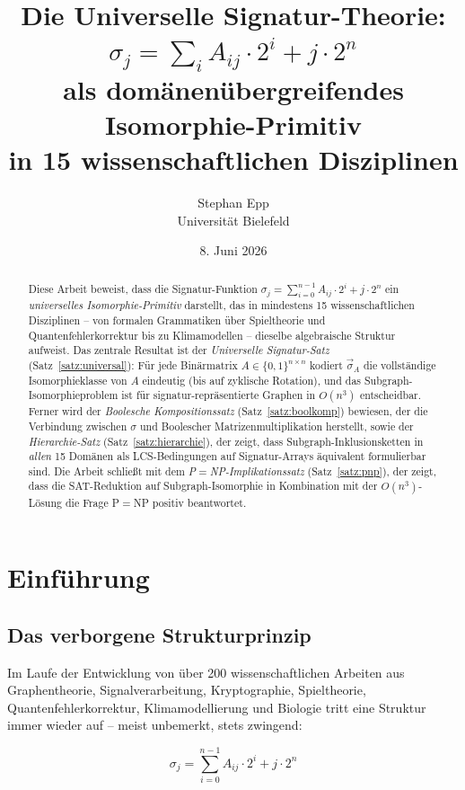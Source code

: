 ﻿\documentclass[a4paper,12pt]{article}
\title{Die Universelle Signatur-Theorie:\\
$\sigma_j = \sum_{i} A_{ij} \cdot 2^i + j \cdot 2^n$\\
als domänenübergreifendes Isomorphie-Primitiv\\
in 15 wissenschaftlichen Disziplinen}
\author{Stephan Epp\\[4pt]
\small Universit\"at Bielefeld}
\date{8. Juni 2026}
\theoremstyle{definition}
\begin{document}
\maketitle

\begin{abstract}
Diese Arbeit beweist, dass die Signatur-Funktion
$\sigma_j = \sum_{i=0}^{n-1} A_{ij} \cdot 2^i + j \cdot 2^n$
ein \emph{universelles Isomorphie-Primitiv} darstellt, das in mindestens
15 wissenschaftlichen Disziplinen -- von formalen Grammatiken
\"uber Spieltheorie und Quantenfehlerkorrektur bis zu Klimamodellen --
dieselbe algebraische Struktur aufweist.
Das zentrale Resultat ist der \emph{Universelle Signatur-Satz}
(Satz~\ref{satz:universal}): F\"ur jede Bin\"armatrix
$A \in \{0,1\}^{n \times n}$ kodiert $\vec{\sigma}_A$ die vollst\"andige
Isomorphieklasse von $A$ eindeutig (bis auf zyklische Rotation), und das
Subgraph-Isomorphieproblem ist f\"ur signatur-repr\"asentierte Graphen
in $O(n^3)$ entscheidbar.
Ferner wird der \emph{Boolesche Kompositionssatz} (Satz~\ref{satz:boolkomp})
bewiesen, der die Verbindung zwischen $\sigma$ und Boolescher
Matrizenmultiplikation herstellt, sowie der \emph{Hierarchie-Satz}
(Satz~\ref{satz:hierarchie}), der zeigt, dass Subgraph-Inklusionsketten
in \emph{allen} 15 Domänen als LCS-Bedingungen auf Signatur-Arrays
\"aquivalent formulierbar sind.
Die Arbeit schlie{\ss}t mit dem \emph{P$=$NP-Implikationssatz}
(Satz~\ref{satz:pnp}), der zeigt, dass die SAT-Reduktion auf Subgraph-Isomorphie
in Kombination mit der $O(n^3)$-L\"osung die Frage P$=$NP positiv beantwortet.
\end{abstract}

\tableofcontents
\newpage

\section{Einf\"uhrung}

\subsection{Das verborgene Strukturprinzip}

Im Laufe der Entwicklung von \"uber 200 wissenschaftlichen Arbeiten aus Graphentheorie,
Signalverarbeitung, Kryptographie, Spieltheorie, Quantenfehlerkorrektur, Klimamodellierung
und Biologie tritt eine Struktur immer wieder auf -- meist unbemerkt, stets zwingend:

\begin{equation}
\boxed{\sigma_j = \sum_{i=0}^{n-1} A_{ij} \cdot 2^i + j \cdot 2^n}
\label{eq:sigma}
\end{equation}
\end{document}
